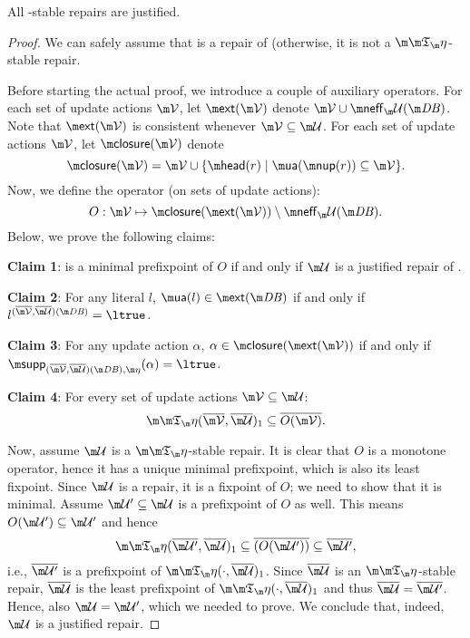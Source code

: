 \begin{proposition}\label{prop:stable_is_justified}
All \Ap-stable repairs are justified. 
\end{proposition}
\begin{proof}
We can safely assume that \UU is a repair of \db (otherwise, it is not a $\Ap$-stable repair.

 Before starting the actual proof, we introduce a couple of auxiliary operators. 
 For each set of update actions $\VV$, let $\ext(\VV)$ denote $\VV\cup \neff_\UU(\db)$.
 Note that $\ext(\VV)$ is consistent whenever $\VV\subseteq\UU$.
 For each set of update actions $\VV$, let $\closure(\VV)$ denote \[\closure(\VV)= \VV\cup \{\head(r) \mid \actof(\nup(r)) \subseteq \VV\}.\] 
 Now, we define the operator (on sets of update actions):
\[O: \VV \mapsto \closure(\ext(\VV)) \setminus \neff_\UU(\db).\]
Below, we prove the following claims:
\begin{compactdesc}
 \item \textbf{Claim 1}: \UU is a minimal prefixpoint of $O$ if and only if $\UU$ is a justified repair of \fulldb. 
 \item \textbf{Claim 2}: For any literal $l$, $\actof(l)\in \ext(\db)$ if and only if $l^{(\overline \VV, \overline \UU)(\db)} = \ltrue$. 
 \item \textbf{Claim 3}: For any update action $\alpha$, $\alpha\in \closure(\ext(\VV))$ if and only if  $\supp_{(\overline\VV,\overline\UU)(\db),\aics}(\alpha) = \ltrue$. 
 \item \textbf{Claim 4}: For every set of update actions $\VV\subseteq \UU$: 
 \[\Ap(\overline\VV,\overline\UU)_1\subseteq \overline{O(\VV)}.\] 
\end{compactdesc}
Now, assume $\UU$ is a $\Ap$-stable repair. It is clear that $O$ is a monotone operator, hence it has a unique minimal prefixpoint, which is also its least fixpoint. Since $\UU$ is a repair, it is a fixpoint of $O$; we need to show that it is minimal. Assume $\UU'\subseteq \UU$ is a prefixpoint of $O$ as well. This means $O(\UU')\subseteq \UU'$ 
and hence 
\[\Ap(\overline{\UU'},\overline\UU)_1 \subseteq \overline{(O(\UU'))}\subseteq \overline{\UU'},\]
i.e., $\overline{\UU'}$ is a prefixpoint of $\Ap(\cdot,\overline\UU)_1$. 
Since $\overline\UU$ is an $\Ap$-stable repair, $\overline\UU$ is the least prefixpoint of $\Ap(\cdot,\overline\UU)_1$ and thus $\overline\UU = \overline{\UU'}$. Hence, also $\UU=\UU'$, which we needed to prove. We conclude that, indeed, $\UU$ is a justified repair. 



\end{proof}
